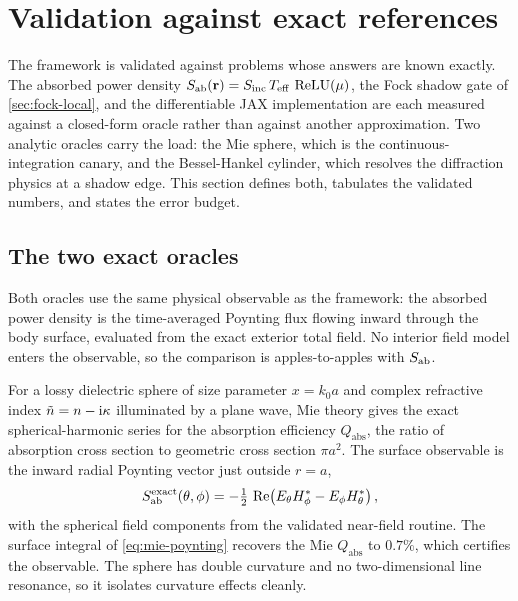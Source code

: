\section{Validation against exact references}\label{sec:validation}

\providecommand{\SAR}{\mathrm{SAR}}
\providecommand{\rhom}{\rho_{\mathrm{m}}}
\providecommand{\Tzero}{T_{0}}
\providecommand{\Qabs}{Q_{\mathrm{abs}}}

The framework is validated against problems whose answers are known exactly. The
absorbed power density $S_{\mathrm{ab}}(\mathbf{r}) = S_{\mathrm{inc}}\,T_{\mathrm{eff}}\,\operatorname{ReLU}(\mu)$, the Fock shadow
gate of \cref{sec:fock-local}, and the differentiable JAX implementation are
each measured against a closed-form oracle rather than against another
approximation. Two analytic oracles carry the load: the Mie sphere, which is the
continuous-integration canary, and the Bessel-Hankel cylinder, which resolves
the diffraction physics at a shadow edge. This section defines both, tabulates
the validated numbers, and states the error budget.

\subsection{The two exact oracles}
\label{sec:val-oracles}

Both oracles use the same physical observable as the framework: the absorbed
power density is the time-averaged Poynting flux flowing inward through the body
surface, evaluated from the exact exterior total field. No interior field model
enters the observable, so the comparison is apples-to-apples with $S_{\mathrm{ab}}$.

\begin{definition}\label{def:mie-oracle}
For a lossy dielectric sphere of size parameter $x = k_0 a$ and complex
refractive index $\tilde{n} = n - \mathrm{i}\kappa$ illuminated by a plane wave,
Mie theory gives the exact spherical-harmonic series for the absorption
efficiency $\Qabs$, the ratio of absorption cross section to geometric cross
section $\pi a^2$. The surface observable is the inward radial Poynting vector
just outside $r = a$,
\begin{equation}\label{eq:mie-poynting}
  S_{\mathrm{ab}}^{\mathrm{exact}}(\theta,\phi)
  = -\tfrac{1}{2}\,\operatorname{Re}\!\left(E_\theta H_\phi^{*} - E_\phi H_\theta^{*}\right),
\end{equation}
with the spherical field components from the validated near-field routine. The
surface integral of \cref{eq:mie-poynting} recovers the Mie $\Qabs$ to
$0.7\%$, which certifies the observable. The sphere has double curvature and no
two-dimensional line resonance, so it isolates curvature effects cleanly.
\end{definition}

